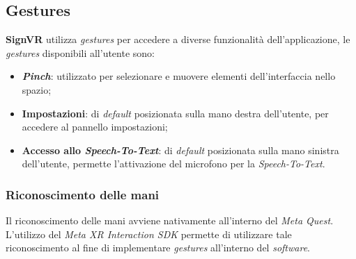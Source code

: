 \documentclass[12pt, a4paper]{article}
\begin{document}
    \subsection{Gestures}
        \textbf{SignVR} utilizza \textit{gestures} per accedere a diverse 
        funzionalità dell'applicazione, le \textit{gestures}
        disponibili all'utente sono: 
        \begin{itemize}
            \item \textbf{\textit{Pinch}}: utilizzato per selezionare e muovere elementi 
            dell'interfaccia nello spazio;
            \item \textbf{Impostazioni}: di \textit{default} posizionata sulla mano destra 
            dell'utente, per accedere al pannello impostazioni;
            \item \textbf{Accesso allo \textit{Speech-To-Text}}: di \textit{default} 
            posizionata sulla mano sinistra dell'utente, permette l'attivazione del 
            microfono per la \textit{Speech-To-Text}.
        \end{itemize}
            \subsubsection{Riconoscimento delle mani}
                Il riconoscimento delle mani avviene nativamente all'interno del 
                \textit{Meta Quest}. L'utilizzo del \textit{Meta XR Interaction SDK} 
                permette di utilizzare tale riconoscimento al fine di implementare 
                \textit{gestures} all'interno del \textit{software}.
\end{document}
